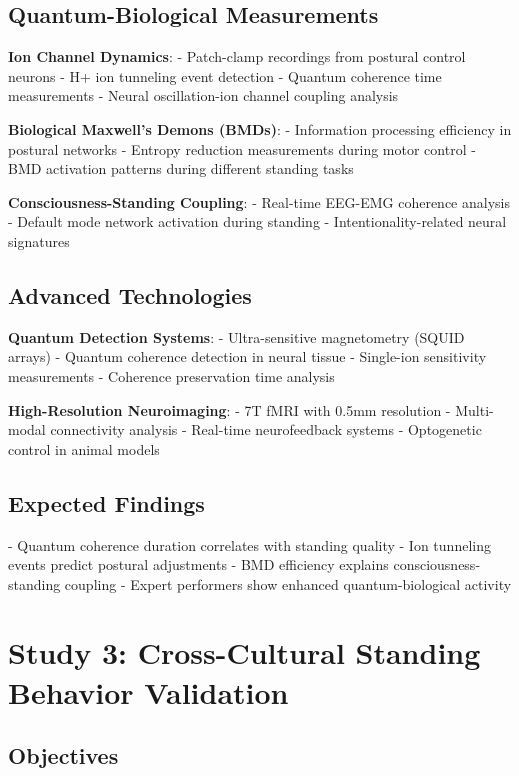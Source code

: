\documentclass[12pt]{article}
\begin{document}
\subsection{Quantum-Biological Measurements}

\textbf{Ion Channel Dynamics}:
- Patch-clamp recordings from postural control neurons
- H+ ion tunneling event detection
- Quantum coherence time measurements
- Neural oscillation-ion channel coupling analysis

\textbf{Biological Maxwell's Demons (BMDs)}:
- Information processing efficiency in postural networks
- Entropy reduction measurements during motor control
- BMD activation patterns during different standing tasks

\textbf{Consciousness-Standing Coupling}:
- Real-time EEG-EMG coherence analysis
- Default mode network activation during standing
- Intentionality-related neural signatures

\subsection{Advanced Technologies}

\textbf{Quantum Detection Systems}:
- Ultra-sensitive magnetometry (SQUID arrays)
- Quantum coherence detection in neural tissue
- Single-ion sensitivity measurements
- Coherence preservation time analysis

\textbf{High-Resolution Neuroimaging}:
- 7T fMRI with 0.5mm resolution
- Multi-modal connectivity analysis
- Real-time neurofeedback systems
- Optogenetic control in animal models

\subsection{Expected Findings}

- Quantum coherence duration correlates with standing quality
- Ion tunneling events predict postural adjustments
- BMD efficiency explains consciousness-standing coupling
- Expert performers show enhanced quantum-biological activity

\section{Study 3: Cross-Cultural Standing Behavior Validation}

\subsection{Objectives}
\end{document}
